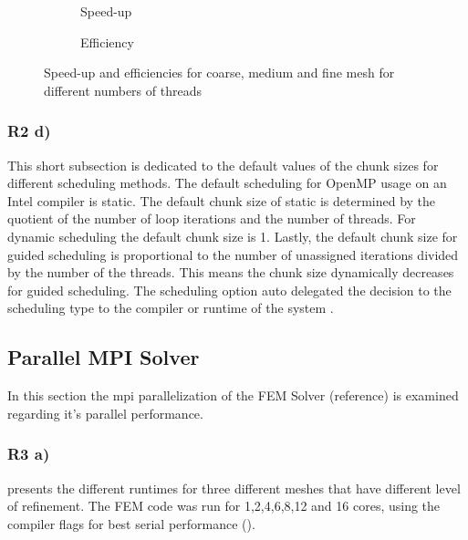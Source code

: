 \begin{figure}[h!]
	\centering
	\begin{subfigure}{0.49\textwidth}
		\centering
		\resizebox{0.5\width}{!}{}
		\caption{\label{fig::SPOpenMP} Speed-up}
	\end{subfigure}
	\hfill
	\begin{subfigure}{0.49\textwidth}
		\centering
		\resizebox{0.5\width}{!}{}
		\caption{\label{fig::EffOpenMP} Efficiency}
	\end{subfigure}
	\caption{\label{fig::EffSPOpenMP} Speed-up and efficiencies for coarse, medium and fine mesh for different numbers of threads}
\end{figure}

\subsubsection{R2 d)}
This short subsection is dedicated to the default values of the chunk sizes for different scheduling methods. The default scheduling for OpenMP usage on an Intel compiler is static. The default chunk size of static is determined by the quotient of the number of loop iterations and the number of threads. For dynamic scheduling the default chunk size is 1. Lastly, the default chunk size for guided scheduling is proportional to the number of unassigned iterations divided by the number of the threads. This means the chunk size dynamically decreases for guided scheduling. The scheduling option auto delegated the decision to the scheduling type to the compiler or runtime of the system \cite{spehOpenMPScheduling2016}.

\clearpage
\subsection{Parallel MPI Solver}

In this section the mpi parallelization of the FEM Solver (reference) is examined regarding it's parallel performance. 

\subsubsection{R3 a)}

 presents the different runtimes for three different meshes that have different level of refinement. The FEM code was run for 1,2,4,6,8,12 and 16 cores, using the compiler flags for best serial performance (). 

